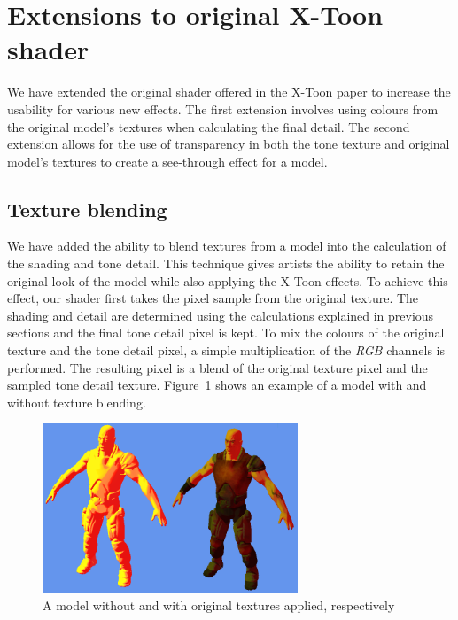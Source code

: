 \documentclass[annual]{acmsiggraph}
\begin{document}
\section{Extensions to original X-Toon shader}
\label{sec:extensions}
We have extended the original shader offered in the X-Toon paper to increase the usability for various new effects. The first extension involves using colours from the original model's textures when calculating the final detail. The second extension allows for the use of transparency in both the tone texture and original model's textures to create a see-through effect for a model. 

\subsection{Texture blending}
\label{sec:blending}
We have added the ability to blend textures from a model into the calculation of the shading and tone detail. This technique gives artists the ability to retain the original look of the model while also applying the X-Toon effects. To achieve this effect, our shader first takes the pixel sample from the original texture. The shading and detail are determined using the calculations explained in previous sections and the final tone detail pixel is kept. To mix the colours of the original texture and the tone detail pixel, a simple multiplication of the {\it{RGB}} channels is performed. The resulting pixel is a blend of the original texture pixel and the sampled tone detail texture. Figure~\ref{fig:texturing} shows an example of a model with and without texture blending.

\begin{figure}[h]
	\centering
	\includegraphics[width=3.0in]{images/textures}
	\caption{A model without and with original textures applied, respectively}
	\label{fig:texturing}
\end{figure}
\end{document}
